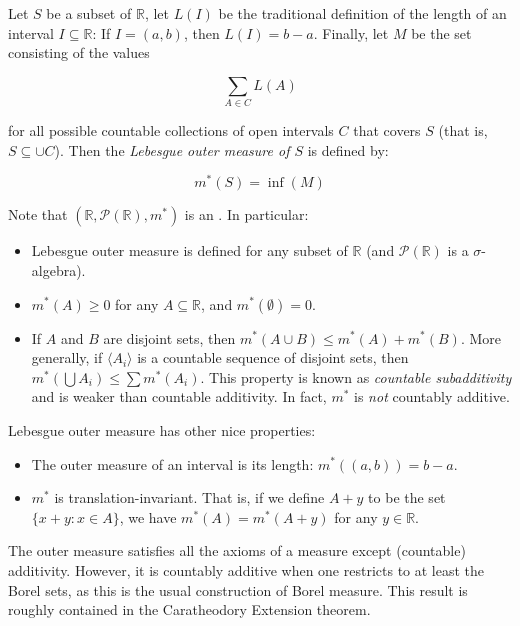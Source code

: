 \documentclass{article}
\begin{document}

Let $S$ be a subset of $\mathbb{R}$, let $L(I)$ be the traditional definition of the length of an interval $I \subseteq \mathbb{R}$: If $I = (a, b)$, then $L(I) = b - a$.  Finally, let $M$ be the set consisting of the values

$$\sum_{A\in C}L(A)$$

for all possible countable collections of open intervals $C$ that covers $S$ (that is, $S \subseteq \cup C$).
\medskip
Then the \emph{Lebesgue outer measure of $S$} is defined by:

$$m^{*}(S) = \inf(M)$$

Note that $(\mathbb{R},\mathcal{P}(\mathbb{R}),m^{*})$ is an .  In particular:
\begin{itemize}
\item Lebesgue outer measure is defined for any subset of $\mathbb{R}$ (and $\mathcal{P}(\mathbb{R})$ is a $\sigma$-algebra).
\item $m^{*}(A) \geq 0$ for any $A \subseteq \mathbb{R}$, and $m^{*}(\emptyset) = 0$.
\item If $A$ and $B$ are disjoint sets, then $m^{*}(A \cup B) \leq m^{*}(A) + m^{*}(B)$.  More generally, if $\langle A_i \rangle$ is a countable sequence of disjoint sets, then $m^{*}\left( \bigcup A_i \right) \leq \sum m^{*}(A_i)$.  This property is known as \emph{countable subadditivity} and is weaker than countable additivity.  In fact, $m^{*}$ is \emph{not} countably additive.
\end{itemize}

Lebesgue outer measure has other nice properties:
\begin{itemize}
\item The outer measure of an interval is its length: $m^{*}((a,b)) = b-a$.
\item $m^{*}$ is translation-invariant.  That is, if we define $A + y$ to be the set $\{ x + y : x \in A \}$, we have $m^{*}(A) = m^{*}(A + y)$ for any $y \in \mathbb{R}$.
\end{itemize}

The outer measure satisfies all the axioms of a measure except (countable) additivity.  However, it is countably additive when one restricts to at least the Borel sets, as this is the usual construction of Borel measure.  This result is roughly contained in the Caratheodory Extension theorem.
\end{document}
